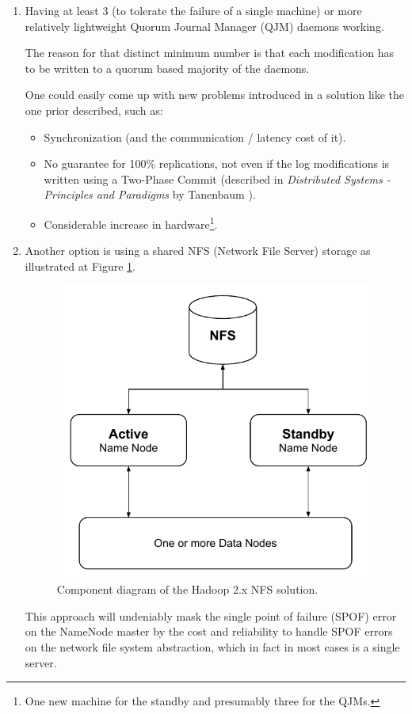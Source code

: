 \begin{enumerate}
	\item Having at least 3 (to tolerate the failure of a single machine) or more relatively lightweight Quorum Journal Manager (QJM) daemons working. 
	
	The reason for that distinct minimum number is that each modification has to be written to a quorum based majority of the daemons. 
	
	One could easily come up with new problems introduced in a solution like the one prior described, such as:
\begin{itemize}
	\item Synchronization (and the communication / latency cost of it).
	\item No guarantee for 100\% replications, not even if the log modifications is written using a Two-Phase Commit (described in \textit{Distributed Systems - Principles and Paradigms} by Tanenbaum \etal \cite{Tanenbaum:2006:DSP:1202502}).
	\item Considerable increase in hardware\footnote{One new machine for the standby and presumably three for the QJMs.}.
\end{itemize}
	\vspace*{3mm}
	
	\item Another option is using a shared NFS (Network File Server) storage as illustrated at Figure \ref{fig:hadoop-2x-nfs}.
	\begin{figure}[h!]
		\centering
		\includegraphics[scale=0.7]{pdf/hadoop-2x-nfs.pdf}
		\caption[Hadoop 2.x NFS solution]{Component diagram of the Hadoop 2.x NFS solution. \label{fig:hadoop-2x-nfs}}
	\end{figure}	

	This approach will undeniably mask the single point of failure (SPOF) error on the NameNode master by the cost and reliability to handle SPOF errors on the network file system abstraction, which in fact in most cases is a single server.
\end{enumerate}

